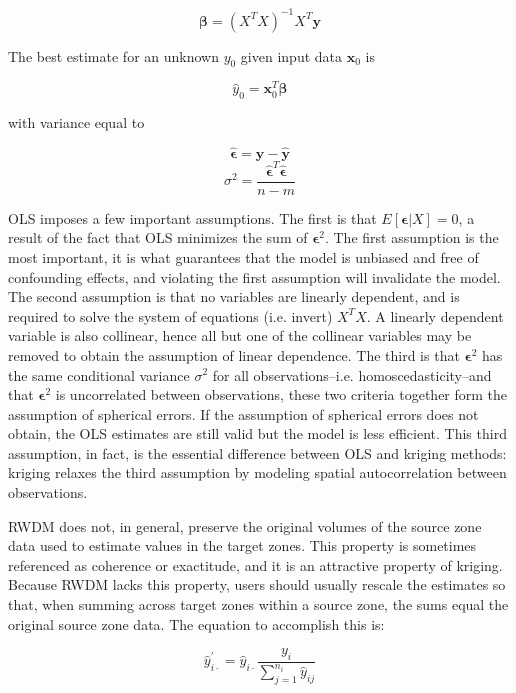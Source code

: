\documentclass[draft]{article}
\begin{document}
\begin{equation} \label{eq:ols}
  \bm{\beta} = (X^T X)^{-1} X^T \bm{y}
\end{equation}

The best estimate for an unknown $y_0$ given input data $\bm{x}_0$ is

\[\hat{y}_0 = \bm{x}_{0}^T \bm{\beta}\]

with variance equal to

\[\hat{\bm{\epsilon}}=\bm{y}-\bm{\hat{y}}\]
\[\sigma^2=\frac{\hat{\bm{\epsilon}}^T\hat{\bm{\epsilon}}}{n-m}\]

OLS imposes a few important assumptions.  The first is that $E[\bm{\epsilon} | X] = 0$, a result of the fact that OLS minimizes the sum of $\bm{\epsilon}^2$.  The first assumption is the most important, it is what guarantees that the model is unbiased and free of confounding effects, and violating the first assumption will invalidate the model.  The second assumption is that no variables are linearly dependent, and is required to solve the system of equations (i.e. invert) $X^TX$.  A linearly dependent variable is also collinear, hence all but one of the collinear variables may be removed to obtain the assumption of linear dependence.  The third is that $\bm{\epsilon}^2$ has the same conditional variance $\sigma^2$ for all observations--i.e. homoscedasticity--and that $\bm{\epsilon}^2$ is uncorrelated between observations, these two criteria together form the assumption of spherical errors.  If the assumption of spherical errors does not obtain, the OLS estimates are still valid but the model is less efficient.  This third assumption, in fact, is the essential difference between OLS and kriging methods: kriging relaxes the third assumption by modeling spatial autocorrelation between observations.

RWDM does not, in general, preserve the original volumes of the source zone data used to estimate values in the target zones.  This property is sometimes referenced as coherence or exactitude, and it is an attractive property of kriging.  Because RWDM lacks this property, users should usually rescale the estimates so that, when summing across target zones within a source zone, the sums equal the original source zone data.  The equation to accomplish this is:

\[\hat{y}^{'}_{i\cdot} = \hat{y}_{i\cdot} \frac{y_i}{\sum_{j=1}^{n_i} \hat{y}_{ij}}\]
\end{document}
